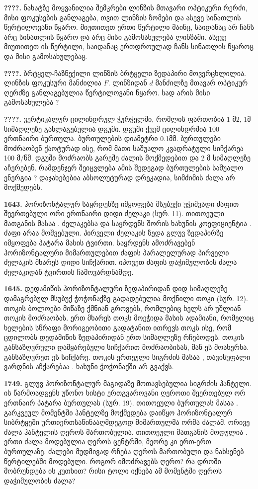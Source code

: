 \documentclass[12pt,a4paper,]{report}
\begin{document}
\textbf{????.} ნახატზე მოყვანილია შემკრები ლინზის მთავარი ოპტიკური რერძი, მისი ფოკუსების განლაგება, თვით ლინზის ზომები და ასევე სინათლის წერტილოვანი წყარო. მიუთითეთ ერთი წერტილი მაინც, საიდანაც არ ჩანს არც სინათლის წყარო და არც მისი გამოსახულება ლინზაში. ასევე მიუთითეთ ის წერტილი, საიდანაც ერთდროულად ჩანს სინათლის წყაროც და მისი გამოსახულებაც.

\textbf{????.} ბრტყელ-ჩაზნექილი ლინზის ბრტყელი ზედაპირი მოვერცხლილია. ლინზის ფოკუსური მანძილია $F$. ლინზიდან $d$ მანძილზე მთავარ ოპტიკურ ღერძზე განლაგებულია წერტილოვანი წყარო. სად არის მისი გამოსახულება ? 

\textbf{????.} ვერტიკალურ ცილინდრულ ჭურჭელში, რომლის ფართობია 1 მ2, 1მ სიმაღლეზე განლაგებულია დგუში. დგუში ქვეშ ცილინდრშია 100 ერთნაირი ბურთულა. ბურთულების დიამეტრი 0.1მმ. ბურთულები მოძრაობენ ქაოტურად ისე, რომ მათი საშუალო კვადრატული სიჩქარეა 100 მ/წმ. დგუში მოძრაობს გარეშე ძალის მოქმედებით და 2 მ სიმაღლეზე აჩერებენ. რამდენჯერ შეიცვლება ამის შედეგად ბურთულების საშუალო ენერგია ? დაჯახებებია აბსოლუტურად დრეკადია, სიმძიმის ძალა არ მოქმედებს. 

\textbf{1643.} ჰორიზონტალურ საყრდენზე იმყოფება მსუბუქი უჭიმვადი ძაფით შეერთებული ორი ერთნაირი დიდი ძელაკი (სურ. 11). თითოეული მათგანის მასაა  . ძელაკებსა და საყრდენს შორის ხახუნის კოეფიციენტია  . ძაფი არაა მოშვებული. პირველი ძელაკის ზედა გლუვ ზედაპირზე იმყოფება პატარა   მასის ტვირთი. საყრდენს ამოძრავებენ ჰორიზონტალური მიმართულებით ძაფის პარალელურად პირველი ძელაკის მხარეს დიდი სიჩქარით. იპოვეთ ძაფის დაჭიმულობის ძალა ძელაკიდან ტვირთის ჩამოვარდნამდე.

\textbf{1645.} დედამიწის ჰორიზონტალური ზედაპირიდან დიდ   სიმაღლეზე დამაგრებულ მსუბუქ ჭოჭონაქზე გადადებულია მოქნილი თოკი (სურ. 12). თოკის ბოლოები მიწაზე ქმნიან გროვებს, რომლებიც ხელს არ უშლიან თოკის მოძრაობას. ერთ მხარეს თოკს მოეჭიდა   მასის ადამიანი, რომელიც  ხელების სწრაფი მორიგეობითი  გადატანით ითრევს თოკს ისე, რომ ცდილობს დედამიწის ზედაპირიდან ერთ სიმაღლეზე რჩებოდეს. თოკის განსაზღვრული დამყარებული სიჩქარით მოძრაობისას, მან ეს მოახერხა. განსაზღვრეთ ეს სიჩქარე. თოკის ერთეული სიგრძის მასაა  , თავისუფალი ვარდნის აჩქარებაა  . ხახუნი ჭოჭონაქში არ გვაქვს.                                                                                                             

\textbf{1749.} გლუვ ჰორიზონტალურ მაგიდაზე მოთავსებულია   სიგრძის ჰანტელი. ის წარმოადგენს უწონო ხისტი ერთგვაროვანი ღეროთი შეერთებულ ორ ერთნაირ პატარა ბურთულას (სურ. 19). თითოეული ბურთულას მასაა  . გარკვეულ მომენტში ჰანტელზე მოქმედება დაიწყო ჰორიზონტალურ სიბრტყეში ურთიერთსაწინააღმდეგოდ მიმართულმა ორმა ძალამ. ორივე ძალა ჰანტელის ღეროს მართობულია. თითოეული მათგანის მოდულია  . ერთი ძალა მოდებულია ღეროს ცენტრში, მეორე კი ერთ-ერთ ბურთულაზე. ძალები მუდმივად რჩება ღეროს მართობული და ნახსენებ წერტილებში მოდებული. როგორ იმოძრავებს ღერო? რა დროში მობრუნდება ის   კუთხით? რისი ტოლი იქნება ამ მომენტში ღეროს დაჭიმულობის ძალა?                                              
\end{document}
